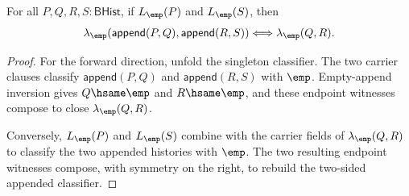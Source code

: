 \begin{theorem}
\label{thm:linearmap-singleton-classifier-append-two-sided-cancel}
For all $P,Q,R,S:\mathsf{BHist}$, if $L_{\emp}(P)$ and $L_{\emp}(S)$, then
$$
\lambda_{\emp}(\mathsf{append}(P,Q),\mathsf{append}(R,S))
\Longleftrightarrow
\lambda_{\emp}(Q,R).
$$
\end{theorem}
\begin{proof}
For the forward direction, unfold the singleton classifier. The two carrier
clauses classify $\mathsf{append}(P,Q)$ and $\mathsf{append}(R,S)$ with
$\emp$. Empty-append inversion gives $Q\hsame\emp$ and $R\hsame\emp$, and
these endpoint witnesses compose to close $\lambda_{\emp}(Q,R)$.

Conversely, $L_{\emp}(P)$ and $L_{\emp}(S)$ combine with the carrier fields of
$\lambda_{\emp}(Q,R)$ to classify the two appended histories with $\emp$.
The two resulting endpoint witnesses compose, with symmetry on the right, to
rebuild the two-sided appended classifier.
\end{proof}

